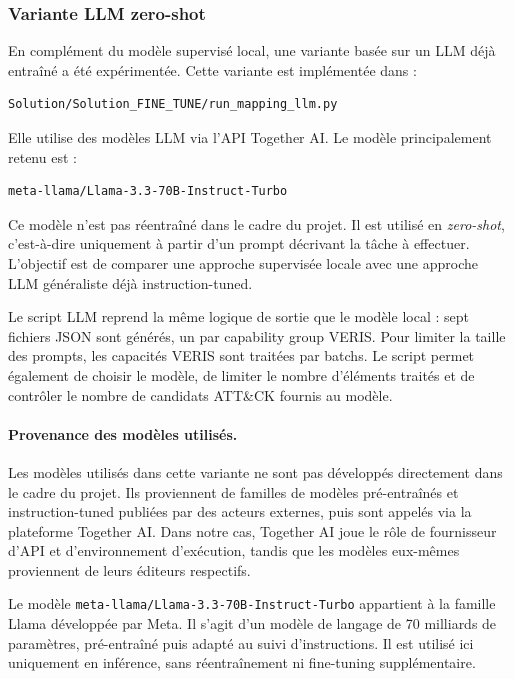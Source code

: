 \documentclass[a4paper,12pt]{article}
\begin{document}
\subsubsection{Variante LLM zero-shot}

En complément du modèle supervisé local, une variante basée sur un LLM déjà entraîné a été expérimentée. Cette variante est implémentée dans :

\begin{verbatim}
Solution/Solution_FINE_TUNE/run_mapping_llm.py
\end{verbatim}

Elle utilise des modèles LLM via l'API Together AI. Le modèle principalement retenu est :

\begin{verbatim}
meta-llama/Llama-3.3-70B-Instruct-Turbo
\end{verbatim}

Ce modèle n'est pas réentraîné dans le cadre du projet. Il est utilisé en \emph{zero-shot}, c'est-à-dire uniquement à partir d'un prompt décrivant la tâche à effectuer. L'objectif est de comparer une approche supervisée locale avec une approche LLM généraliste déjà instruction-tuned.

Le script LLM reprend la même logique de sortie que le modèle local : sept fichiers JSON sont générés, un par capability group VERIS. Pour limiter la taille des prompts, les capacités VERIS sont traitées par batchs. Le script permet également de choisir le modèle, de limiter le nombre d'éléments traités et de contrôler le nombre de candidats ATT\&CK fournis au modèle.

\paragraph{Provenance des modèles utilisés.}

Les modèles utilisés dans cette variante ne sont pas développés directement dans le cadre du projet. Ils proviennent de familles de modèles pré-entraînés et instruction-tuned publiées par des acteurs externes, puis sont appelés via la plateforme Together AI. Dans notre cas, Together AI joue le rôle de fournisseur d'API et d'environnement d'exécution, tandis que les modèles eux-mêmes proviennent de leurs éditeurs respectifs.

Le modèle \texttt{meta-llama/Llama-3.3-70B-Instruct-Turbo} appartient à la famille Llama développée par Meta. Il s'agit d'un modèle de langage de 70 milliards de paramètres, pré-entraîné puis adapté au suivi d'instructions. Il est utilisé ici uniquement en inférence, sans réentraînement ni fine-tuning supplémentaire.
\end{document}
